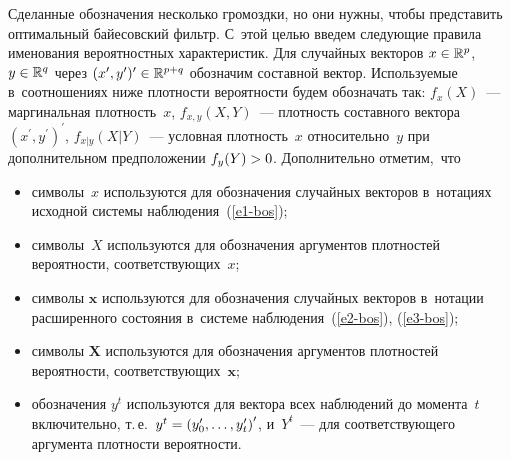 \begin{multicols}{2}
     Сделанные обозначения несколько громоздки, но они нуж\-ны, чтобы 
пред\-ста\-вить оптимальный байесовский фильтр. С~этой \mbox{целью} введем 
сле\-ду\-ющие правила именования вероятностных характеристик. Для 
случайных векторов $x\hm\in \mathbb{R}^p$, $y\hm\in \mathbb{R}^q$ через 
$(x^\prime, y^\prime)^\prime \hm\in \mathbb{R}^{p+q}$ обозначим со\-став\-ной 
вектор. %
Ис\-поль\-зу\-емые в~соотношениях ниже плот\-ности ве\-ро\-ят\-ности будем 
обозначать так: $f_x(X)$~--- маргинальная плот\-ность~$x$,  
$f_{x,y}(X,Y)$~--- плот\-ность со\-став\-но\-го вектора $(x^\prime, 
y^\prime)^\prime$, $f_{x\vert y} (X\vert Y)$~--- услов\-ная плот\-ность~$x$ 
относительно~$y$ при дополнительном предположении $f_y(Y)\hm>0$. 
Дополнительно от\-ме\-тим,~что
     \begin{itemize}
\item символы~$x$ используются для обозначения случайных век\-то\-ров 
в~нотациях исходной сис\-те\-мы наблюдения~(\ref{e1-bos});
\item символы~$X$ используются для обозначения аргументов плотностей 
вероятности, со\-от\-вет\-ст\-ву\-ющих~$x$;
\item символы $\mathbf{x}$ используются для обозначения случайных 
векторов в~нотации расширенного со\-сто\-яния в~сис\-те\-ме 
 наблюдения~(\ref{e2-bos}), (\ref{e3-bos});
\item символы $\mathbf{X}$ используются для обозна\-че\-ния аргументов 
плотностей ве\-ро\-ят\-ности, со\-от\-вет\-ст\-ву\-ющих~$\mathbf{x}$;
\item обозначения $y^t$ используются для век\-то\-ра всех наблюдений до 
момента~$t$ включительно, т.\,е.\ $y^t\hm= \left( y_0^\prime, \ldots , 
y_t^\prime\right)^\prime$, и~$Y^t$~--- для со\-от\-вет\-ст\-ву\-юще\-го аргумента  
плот\-ности ве\-ро\-ят\-ности.
\end{itemize}


\end{multicols}
